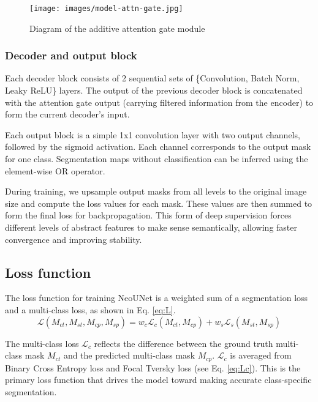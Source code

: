 \documentclass[runningheads]{llncs}
\newcommand{\ModelName}{NeoUNet\xspace}
\begin{document}
	\begin{figure}
		\centering
		\texttt{[image: images/model-attn-gate.jpg]}
		\caption{Diagram of the additive attention gate module \cite{oktay2018attention}}
		\label{fig:attn}
	\end{figure}

	\subsubsection{Decoder and output block}
	Each decoder block consists of 2 sequential sets of \{Convolution, Batch Norm, Leaky ReLU\} layers. The output of the previous decoder block is concatenated with the attention gate output (carrying filtered information from the encoder) to form the current decoder's input.

	Each output block is a simple 1x1 convolution layer with two output channels, followed by the sigmoid activation. Each channel corresponds to the output mask for one class. Segmentation maps without classification can be inferred using the element-wise OR operator.

	During training, we upsample output masks from all levels to the original image size and compute the loss values for each mask. These values are then summed to form the final loss for backpropagation. This form of deep supervision forces different levels of abstract features to make sense semantically, allowing faster convergence and improving stability.

	\subsection{Loss function}
	The loss function for training \ModelName is a weighted sum of a segmentation loss and a multi-class loss, as shown in Eq. \eqref{eq:L}.
	\begin{equation}
	\label{eq:L}
	\mathcal{L}(M_{ct}, M_{st}, M_{cp}, M_{sp}) = w_c \mathcal{L}_{c}(M_{ct}, M_{cp}) + w_s \mathcal{L}_{s}(M_{st}, M_{sp})
	\end{equation}

	The multi-class loss $\mathcal{L}_{c}$ reflects the difference between the ground truth multi-class mask $M_{ct}$ and the predicted multi-class mask $M_{cp}$. $\mathcal{L}_{c}$ is averaged from Binary Cross Entropy loss and Focal Tversky loss \cite{abraham2019novel} (see Eq. \eqref{eq:Lc}). This is the primary loss function that drives the model toward making accurate class-specific segmentation.
\end{document}
